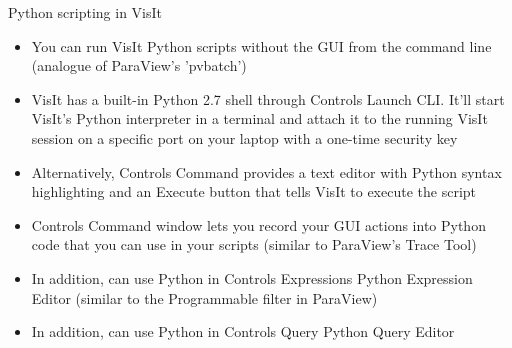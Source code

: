 \begin{comment}
http://www.visitusers.org/index.php?title=VisIt-tutorial-Python-scripting
http://www.visitusers.org/index.php?title=VisIt-tutorial-Advanced-scripting
http://www.visitusers.org/index.php?title=Exporting_databases
\end{comment}


\begin{frame}{Python scripting in VisIt}{}
  \footnotesize{
    \begin{itemize}\setlength{\itemsep}{1mm}
    \item[\ding{80}] You can run VisIt Python scripts without the GUI from the command line (analogue of
      ParaView's 'pvbatch')\guiless
    \item[\ding{80}] VisIt has a built-in Python 2.7 shell through Controls \ra Launch CLI. It'll start
      VisIt's Python interpreter in a terminal and attach it to the running VisIt session on a specific
      port on your laptop with a one-time security key
    \item[\ding{80}] Alternatively, Controls \ra Command provides a text editor with Python syntax
      highlighting and an Execute button that tells VisIt to execute the script
    \item {\color{red}Controls \ra Command window lets you record your GUI actions into Python code that
      you can use in your scripts (similar to ParaView's Trace Tool)}
    \item {\color{blue}In addition, can use Python in Controls \ra Expressions \ra Python Expression
      Editor (similar to the Programmable filter in ParaView)}
    \item {\color{blue}In addition, can use Python in Controls \ra Query \ra Python Query Editor}
    \end{itemize}}
\end{frame}


